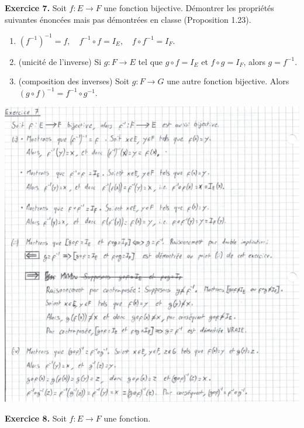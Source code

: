 \documentclass[a4paper, 10pt]{report}
\begin{document}
	\newpage
	
	\noindent
	\textbf{Exercice 7.} Soit $f: E \to F$ une fonction bijective.
	Démontrer les propriétés suivantes énoncées mais pas démontrées
	en classe (Proposition 1.23).
	
	\begin{enumerate}[label=(\roman*)]
		\item $(f^{-1})^{-1} = f, \quad
			f^{-1} \circ f = I_E, \quad
			f \circ f^{-1} = I_F$.
		\item (unicité de l'inverse) Si $g : F \to E$ tel que
		$g \circ f = I_E$ et $f \circ g = I_F$, alors $g = f^{-1}$.
		\item (composition des inverses) Soit $g : F \to G$ une autre
		fonction bijective. Alors
		$(g \circ f)^{-1} = f^{-1} \circ g^{-1}$.
	\end{enumerate}
		
	\includegraphics{ex07.jpg}
	
	\newpage
	\noindent
	\textbf{Exercice 8.} Soit $f : E \to F$ une fonction.
	
\end{document}
